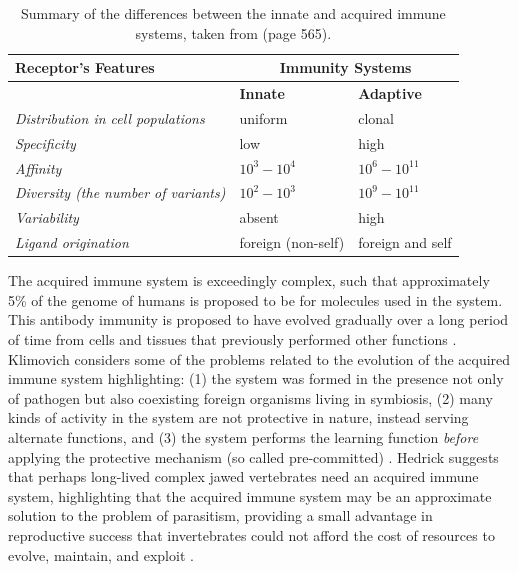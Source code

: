 \begin{table}[ht]
	\centering\small
		\begin{tabular}{lll}
		\toprule
		\textbf{Receptor's Features} & \multicolumn{2}{c}{\textbf{Immunity Systems}} \\ 
		\midrule
		 & \textbf{Innate} & \textbf{Adaptive} \\ 
		\toprule
		\emph{Distribution in cell populations} & uniform & clonal \\ 
		\emph{Specificity} & low & high \\ 
		\emph{Affinity} & $10^3-10^4$ & $10^6-10^{11}$ \\ 
		\emph{Diversity (the number of variants)} & $10^2-10^3$ & $10^9-10^{11}$ \\ 
		\emph{Variability} & absent & high \\ 
		\emph{Ligand origination} & foreign (non-self) & foreign and self \\ 
		\bottomrule
		\end{tabular}
	\caption{Summary of the differences between the innate and acquired immune systems, taken from \cite{Klimovich2002} (page 565).}
	\label{tab:hosts:evolution:innateacquired}
\end{table}

The acquired immune system is exceedingly complex, such that approximately 5\% of the genome of humans is proposed to be for molecules used in the system. This antibody immunity is proposed to have evolved gradually over a long period of time from cells and tissues that previously performed other functions \cite{Klein2005}. Klimovich considers some of the problems related to the evolution of the acquired immune system highlighting: (1) the system was formed in the presence not only of pathogen but also coexisting foreign organisms living in symbiosis, (2) many kinds of activity in the system are not protective in nature, instead serving alternate functions, and (3) the system performs the learning function \emph{before} applying the protective mechanism (so called pre-committed) \cite{Klimovich2002}. Hedrick suggests that perhaps long-lived complex jawed vertebrates need an acquired immune system, highlighting that the acquired immune system may be an approximate solution to the problem of parasitism, providing a small advantage in reproductive success that invertebrates could not afford the cost of resources to evolve, maintain, and exploit \cite{Hedrick2004}.


%
%

